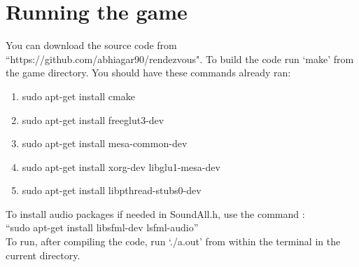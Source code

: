 \chapter{Running the game}

You can download the source code from ``https://github.com/abhiagar90/rendezvous". To build the code run `make' from the game directory.
You should have these commands already ran:
\begin{enumerate}
\item sudo apt-get install cmake
\item sudo apt-get install freeglut3-dev
\item sudo apt-get install mesa-common-dev
\item sudo apt-get install xorg-dev libglu1-mesa-dev
\item sudo apt-get install libpthread-stubs0-dev
\end{enumerate}

To install audio packages if needed in SoundAll.h, use the command : \\ ``sudo apt-get install libsfml-dev lsfml-audio'' \\

To run, after compiling the code, run `./a.out' from within the terminal in the current directory.
